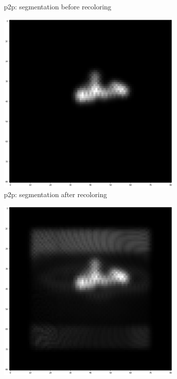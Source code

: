 \begin{figure}
\begin{subfigure}[t]{0.16\linewidth}
        \caption{p2p: segmentation before recoloring}
        \label{methods:pic8}
    \end{subfigure}
    \hfill
    \begin{subfigure}[t]{0.16\linewidth}
        \centering
        \includegraphics[width=\textwidth]{figures/methods9.png}
        \caption{p2p: segmentation after recoloring}
        \label{methods:pic9}
    \end{subfigure}
    \hfill
    \begin{subfigure}[t]{0.16\linewidth}
        \centering
        \includegraphics[width=\textwidth]{figures/methods10.png}

\end{subfigure}
\end{figure}
